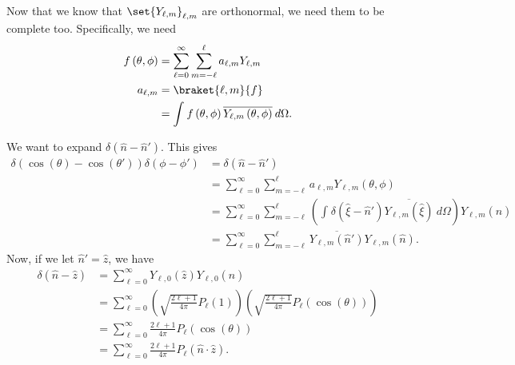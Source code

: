 \documentclass[10pt]{mypackage}
\begin{document}
  Now that we know that $\set{Y_{\ell,m}}_{\ell,m}$ are orthonormal, we need them to be complete too. Specifically, we need
  \begin{align*}
    f\left( \theta,\phi \right) &= \sum_{\ell=0}^{\infty}\sum_{m=-\ell}^{\ell}a_{\ell,m}Y_{\ell,m}\\
    a_{\ell,m} &= \braket{\ell,m}{f}\\
               &= \int_{}^{} f\left( \theta,\phi \right) \overline{Y_{\ell,m}\left( \theta,\phi \right)}\:d\Omega.
  \end{align*}
  \begin{example}
    We want to expand $\delta\left( \hat{n}-\hat{n}' \right)$. This gives
    \begin{align*}
      \delta\left( \cos\left( \theta \right)-\cos\left( \theta' \right) \right)\delta\left( \phi-\phi' \right) &= \delta\left( \hat{n}-\hat{n}' \right)\\
                                                                           &= \sum_{\ell=0}^{\infty}\sum_{m=-\ell}^{\ell}a_{\ell,m}Y_{\ell,m}\left( \theta,\phi \right)\\
                                            &= \sum_{\ell=0}^{\infty}\sum_{m=-\ell}^{\ell} \left( \int_{}^{} \delta\left( \hat{\xi}-\hat{n}' \right) \overline{Y_{\ell,m}\left( \hat{\xi} \right)}\:d\Omega \right) Y_{\ell,m}\left( \hat{n} \right)\\
                                            &= \sum_{\ell=0}^{\infty}\sum_{m=-\ell}^{\ell} \overline{Y_{\ell,m}\left( \hat{n}' \right)} Y_{\ell,m}\left( \hat{n} \right).
    \end{align*}
    Now, if we let $\hat{n}' = \hat{z}$, we have
    \begin{align*}
      \delta\left( \hat{n}-\hat{z} \right) &= \sum_{\ell=0}^{\infty}Y_{\ell,0}\left( \hat{z} \right) Y_{\ell,0}\left( \hat{n} \right)\\
                                           &= \sum_{\ell=0}^{\infty} \left( \sqrt{\frac{2\ell + 1}{4\pi}}P_{\ell}\left( 1 \right) \right) \left( \sqrt{\frac{2\ell + 1}{4\pi}} P_{\ell}\left( \cos\left( \theta \right) \right) \right)\\
                                           &= \sum_{\ell=0}^{\infty}\frac{2\ell + 1}{4\pi}P_{\ell}\left( \cos\left( \theta \right) \right)\\
                                           &= \sum_{\ell=0}^{\infty}\frac{2\ell + 1}{4\pi} P_{\ell}\left( \hat{n}\cdot \hat{z} \right).
    \end{align*}

\end{example}
\end{document}

